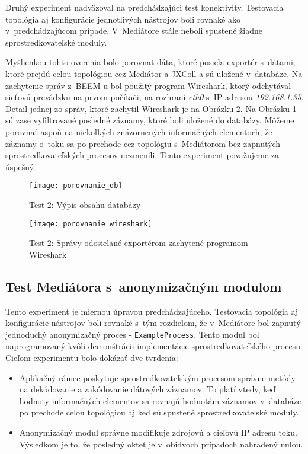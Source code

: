 Druhý experiment nadväzoval na predchádzajúci test konektivity. Testovacia topológia aj konfigurácie 
jednotlivých nástrojov boli rovnaké ako v~predchádzajúcom prípade. V~Mediátore stále neboli spustené 
žiadne sprostredkovateľské moduly. 

Myšlienkou tohto overenia bolo porovnať dáta, ktoré posiela exportér s~dátami, ktoré prejdú celou topológiou
cez Mediátor a JXColl a sú uložené v~databáze. Na zachytenie správ z~BEEM-u bol použitý program 
Wireshark, ktorý odchytával sieťovú prevádzku na prvom počítači, na rozhraní \emph{eth0} s~IP adresou 
\emph{192.168.1.35}. Detail jednej zo správ, ktoré zachytil Wireshark je na Obrázku 
\ref{o:porovnanie_wireshark}. Na Obrázku \ref{o:porovnanie_db} sú zase vyfiltrované posledné záznamy, 
ktoré boli uložené do databázy. Môžeme porovnať aspoň na niekoľkých znázornených informačných elementoch,
že záznamy o~toku sa po prechode cez topológiu s~Mediátorom bez zapnutých sprostredkovateľských procesov 
nezmenili. Tento experiment považujeme za úspešný.

\begin{figure}[ht!]
\centering
\texttt{[image: porovnanie\_db]}
\caption{Test 2: Výpis obsahu databázy}\label{o:porovnanie_db}
\end{figure}

\begin{figure}[ht!]
\centering
\texttt{[image: porovnanie\_wireshark]}
\caption{Test 2: Správy odosielané exportérom zachytené programom Wireshark}\label{o:porovnanie_wireshark}
\end{figure}




\subsection{Test Mediátora s~anonymizačným modulom}

Tento experiment je miernou úpravou predchádzajúceho. Testovacia topológia aj konfigurácie nástrojov boli 
rovnaké s~tým rozdielom, že v~Mediátore bol zapnutý jednoduchý anonymizačný proces - \verb|ExampleProcess|.
Tento modul bol naprogramovaný kvôli demonštrácii implementácie sprostredkovateľského procesu. Cieľom 
experimentu bolo dokázať dve tvrdenia:
\begin{itemize}
 \item Aplikačný rámec poskytuje sprostredkovateľským procesom správne metódy na dekódovanie a zakódovanie
 dátových záznamov. To platí vtedy, keď hodnoty informačných elementov sa rovnajú hodnotám záznamov
 v~databáze po prechode celou topológiou aj keď sú spustené sprostredkovateľské moduly.
 \item Anonymizačný modul správne modifikuje zdrojovú a cieľovú IP adresu toku. Výsledkom je to, že 
 posledný oktet je v~obidvoch prípadoch nahradený nulou.
\end{itemize}

